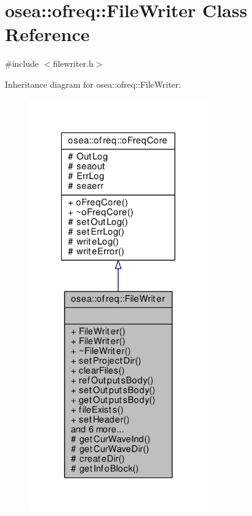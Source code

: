 \hypertarget{classosea_1_1ofreq_1_1_file_writer}{\section{osea\-:\-:ofreq\-:\-:File\-Writer Class Reference}
\label{classosea_1_1ofreq_1_1_file_writer}
}


{\ttfamily \#include $<$filewriter.\-h$>$}



Inheritance diagram for osea\-:\-:ofreq\-:\-:File\-Writer\-:\nopagebreak
\begin{figure}[H]
\begin{center}
\leavevmode
\includegraphics[width=218pt]{classosea_1_1ofreq_1_1_file_writer__inherit__graph}
\end{center}
\end{figure}
